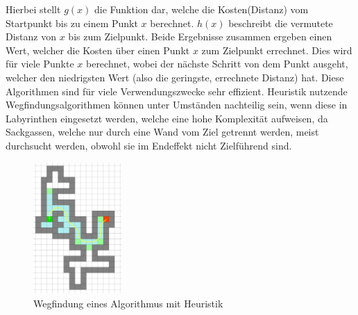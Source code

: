 {{{{			Hierbei stellt $g(x)$ die Funktion dar, welche die Kosten(Distanz) vom Startpunkt bis zu einem Punkt $x$ berechnet. $h(x)$ beschreibt die vermutete Distanz von $x$ bis zum Zielpunkt. Beide Ergebnisse zusammen ergeben einen Wert, welcher die Kosten über einen Punkt $x$ zum Zielpunkt errechnet. Dies wird für viele Punkte $x$ berechnet, wobei der nächste Schritt von dem Punkt ausgeht, welcher den niedrigsten Wert (also die geringste, errechnete Distanz) hat.
			Diese Algorithmen sind für viele Verwendungszwecke sehr effizient. Heuristik nutzende Wegfindungsalgorithmen können unter Umständen nachteilig sein, wenn diese in Labyrinthen eingesetzt werden, welche eine hohe Komplexität aufweisen, da Sackgassen, welche nur durch eine Wand vom Ziel getrennt werden, meist durchsucht werden, obwohl sie im Endeffekt nicht Zielführend sind.
			
			\begin{figure}[H]
				\centering
				\includegraphics[height=5cm]{Bilder/pathfinding_laby_heu.png}
				\caption{Wegfindung eines Algorithmus mit Heuristik} 
				\label{pic:pathlabheu}
			\end{figure}
		
		
		
		
}}}}
